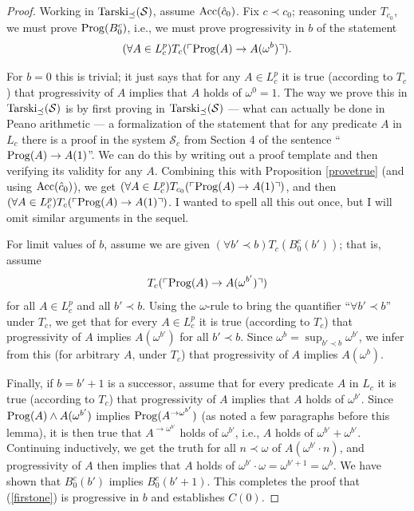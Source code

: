 \documentclass{amsart}
\begin{document}
\begin{proof}
Working in ${\rm Tarski}_{\preceq}(\mathcal{S})$, assume ${\rm Acc}(\hat{c}_0)$. Fix $c \prec c_0$;
reasoning under $T_{c_0}$, we must prove
${\rm Prog}(B_0^c)$, i.e., we must prove progressivity in $b$ of the statement
\begin{equation}\label{firstone}
(\forall A \in L_c^p)T_c(\ulcorner{\rm Prog}(A) \to A(\omega^b)\urcorner).
\end{equation}

For $b = 0$ this is trivial; it just says that for any $A \in L_c^p$ it is true (according to $T_c$)
that  progressivity of $A$ implies that $A$ holds of $\omega^0 = 1$. The way we prove this in
${\rm Tarski}_{\preceq}(\mathcal{S})$ is by first proving in ${\rm Tarski}_{\preceq}(\mathcal{S})$
--- what can actually be done in Peano arithmetic --- a formalization of the statement that for any
predicate $A$ in $L_c$ there is a proof in the system $\mathcal{S}_c$ from Section 4 of the
sentence ``${\rm Prog}(A) \to A(1)$''. We can do this by writing out a proof template and then
verifying its validity for any $A$. Combining this with Proposition \ref{provetrue} (and using
${\rm Acc}(\hat{c}_0)$), we get $(\forall A \in L_c^p)T_{c_0}(\ulcorner{\rm Prog}(A) \to A(1)\urcorner)$,
and then $(\forall A \in L_c^p)T_c(\ulcorner{\rm Prog}(A) \to A(1)\urcorner)$.
I wanted to spell all this out once, but I will omit similar arguments in the sequel.

For limit values of $b$, assume we are given $(\forall b' \prec b)T_c(B_0^c(b'))$; that is, assume
$$T_c(\ulcorner {\rm Prog}(A) \to A(\omega^{b'})\urcorner)$$
for all $A \in L_c^p$ and all $b' \prec b$. Using the $\omega$-rule to bring the quantifier
``$\forall b' \prec b$'' under $T_c$, we get that for every $A \in L_c^p$ it is true (according to
$T_c$) that progressivity of $A$ implies $A(\omega^{b'})$ for all $b' \prec b$. Since $\omega^b =
\sup_{b' \prec b} \omega^{b'}$, we infer from this (for arbitrary $A$, under $T_c$) that
progressivity of $A$ implies $A(\omega^b)$.

Finally, if $b = b' + 1$ is a successor, assume that for every predicate $A$ in $L_c$ it is true
(according to $T_c$) that progressivity of $A$ implies that $A$ holds of $\omega^{b'}$.
Since ${\rm Prog}(A) \wedge A(\omega^{b'})$ implies ${\rm Prog}(A^{\to \omega^{b'}})$ (as
noted a few paragraphs before this lemma), it is then true that $A^{\to \omega^{b'}}$ holds
of $\omega^{b'}$, i.e., $A$ holds of $\omega^{b'} + \omega^{b'}$. Continuing inductively, we get the
truth for all $n \prec \omega$ of $A(\omega^{b'}\cdot n)$, and progressivity of $A$ then
implies that $A$ holds of $\omega^{b'}\cdot \omega = \omega^{b' + 1} = \omega^b$.
We have shown that $B_0^c(b')$ implies $B_0^c(b' + 1)$. This
completes the proof that (\ref{firstone}) is progressive in $b$ and establishes $C(0)$.
\end{proof}
\end{document}
